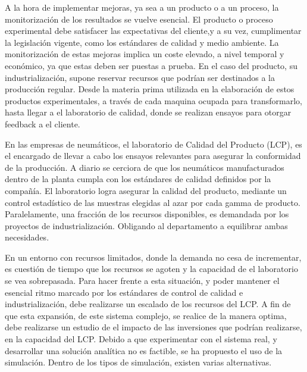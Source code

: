 A la hora de implementar mejoras, ya sea a un producto o a un proceso,
la monitorización de los resultados se vuelve esencial.
El producto o proceso experimental debe satisfacer las expectativas del cliente,y a su vez, cumplimentar la legislación vigente,
como los estándares de calidad y medio ambiente.
La monitorización de estas mejoras implica un coste elevado,
a nivel temporal y económico, ya que estas deben ser puestas a prueba.
En el caso del producto, su industrialización,
supone reservar recursos que podrían ser destinados a la producción regular.
Desde la materia prima utilizada
en la elaboración de estos productos experimentales,
a través de cada maquina ocupada para transformarlo,
hasta llegar a el laboratorio de calidad,
donde se realizan ensayos para otorgar feedback a el cliente.

En las empresas de neumáticos, el laboratorio de Calidad del Producto (LCP),
es el encargado de llevar a cabo los ensayos relevantes
para asegurar la conformidad de la producción.
A diario se cerciora de que los neumáticos manufacturados dentro de la planta
cumpla con los estándares de calidad definidos por la compañía.
El laboratorio logra asegurar la calidad del producto,
mediante un control estadístico de las muestras
elegidas al azar por cada gamma de producto.
Paralelamente, una fracción de los recursos disponibles,
es demandada por los proyectos de industrialización.
Obligando al departamento a equilibrar ambas necesidades.

En un entorno con recursos limitados,
donde la demanda no cesa de incrementar,
es cuestión de tiempo que los recursos se agoten
y la capacidad de el laboratorio se vea sobrepasada.
Para hacer frente a esta situación,
y poder mantener el esencial ritmo
marcado por los estándares de control de calidad e industrialización,
debe realizarse un escalado de los recursos del LCP.
A fin de que esta expansión, de este sistema complejo,
se realice de la manera optima,
debe realizarse un estudio de el impacto
de las inversiones que podrían realizarse, en la capacidad del LCP.
Debido a que experimentar con el sistema real,
y desarrollar una solución analítica no es factible,
se ha propuesto el uso de la simulación.
Dentro de los tipos de simulación, existen varias alternativas.

